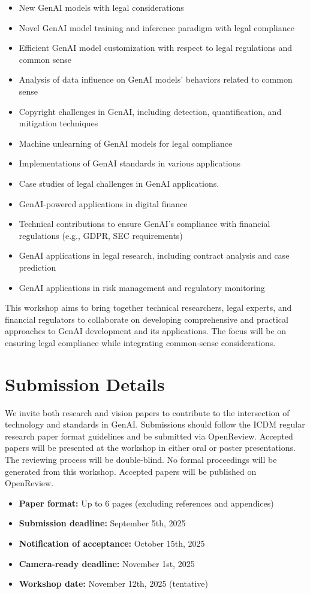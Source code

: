 \documentclass[conference]{IEEEtran}
\begin{document}
\begin{itemize}[leftmargin=*]
\item New GenAI models with legal considerations
\item Novel GenAI model training and inference paradigm with legal compliance
\item Efficient GenAI model customization with respect to legal regulations and common sense
\item Analysis of data influence on GenAI models' behaviors related to common sense
\item Copyright challenges in GenAI, including detection, quantification, and mitigation techniques
\item Machine unlearning of GenAI models for legal compliance
\item Implementations of GenAI standards in various applications
\item Case studies of legal challenges in GenAI applications.
\item GenAI-powered applications in digital finance
\item Technical contributions to ensure GenAI's compliance with financial regulations (e.g., GDPR, SEC requirements)
\item GenAI applications in legal research, including contract analysis and case prediction
\item GenAI applications in risk management and regulatory monitoring
\end{itemize}

This workshop aims to bring together technical researchers, legal experts, and financial regulators to collaborate on developing comprehensive and practical approaches to GenAI development and its applications. The focus will be on ensuring legal compliance while integrating common-sense considerations.

\section{Submission Details}
We invite both research and vision papers to contribute to the intersection of technology and standards in GenAI. Submissions should follow the ICDM regular research paper format guidelines and be submitted via OpenReview.
Accepted papers will be presented at the workshop in either oral or poster presentations. The reviewing process will be double-blind. No formal proceedings will be generated from this workshop. Accepted papers will be published on OpenReview.
\begin{itemize}
    \item \textbf{Paper format:} Up to 6 pages (excluding references and appendices)
    \item \textbf{Submission deadline:} September 5th, 2025
    \item \textbf{Notification of acceptance:} October 15th, 2025
    \item \textbf{Camera-ready deadline:} November 1st, 2025
    \item \textbf{Workshop date:} November 12th, 2025 (tentative)
\end{itemize}
    
\end{document}
